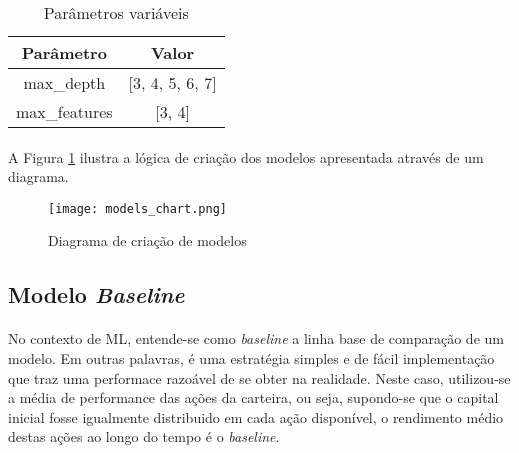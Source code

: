 \begin{table}[!htb]
    \begin{center}
        \begin{tabular}{ c|c }
            Parâmetro & Valor \\
            \hline
            max\_depth & [3, 4, 5, 6, 7] \\
            max\_features & [3, 4] \\
        \end{tabular}
        \caption{Parâmetros variáveis}
        \label{tab:16}
    \end{center}
\end{table}

\paragraph{} A Figura \ref{fig:580} ilustra a lógica de criação dos modelos apresentada através de um diagrama.

\begin{figure}[!htb]
    \texttt{[image: models\_chart.png]}
    \centering
    \caption{Diagrama de criação de modelos}
    \label{fig:580}
\end{figure}



\FloatBarrier
\subsection{Modelo \textit{Baseline}}
\label{sub:baseline}

\paragraph{} No contexto de ML, entende-se como \textit{baseline} a linha base de comparação de um modelo. Em outras palavras, é uma estratégia simples e de fácil implementação que traz uma performace razoável de se obter na realidade. Neste caso, utilizou-se a média de performance das ações da carteira, ou seja, supondo-se que o capital inicial fosse igualmente distribuido em cada ação disponível, o rendimento médio destas ações ao longo do tempo é o \textit{baseline}.

